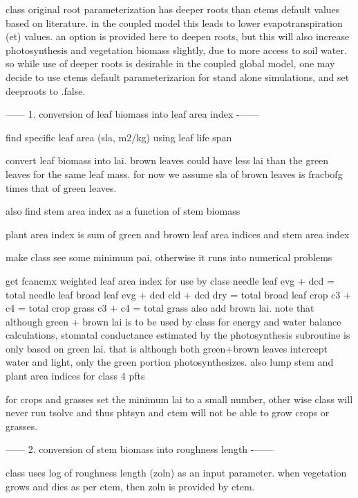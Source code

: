 class\textquotesingle{} original root parameterization has deeper roots than ctem\textquotesingle{}s default values based on literature. in the coupled model this leads to lower evapotranspiration (et) values. an option is provided here to deepen roots, but this will also increase photosynthesis and vegetation biomass slightly, due to more access to soil water. so while use of deeper roots is desirable in the coupled global model, one may decide to use ctem\textquotesingle{}s default parameterizarion for stand alone simulations, and set deeproots to .false.

------ 1. conversion of leaf biomass into leaf area index -\/------

find specific leaf area (sla, m2/kg) using leaf life span

convert leaf biomass into lai. brown leaves could have less lai than the green leaves for the same leaf mass. for now we assume sla of brown leaves is fracbofg times that of green leaves.

also find stem area index as a function of stem biomass

plant area index is sum of green and brown leaf area indices and stem area index

make class see some minimum pai, otherwise it runs into numerical problems

get fcancmx weighted leaf area index for use by class needle leaf evg + dcd = total needle leaf broad leaf evg + dcd cld + dcd dry = total broad leaf crop c3 + c4 = total crop grass c3 + c4 = total grass also add brown lai. note that although green + brown lai is to be used by class for energy and water balance calculations, stomatal conductance estimated by the photosynthesis subroutine is only based on green lai. that is although both green+brown leaves intercept water and light, only the green portion photosynthesizes. also lump stem and plant area indices for class\textquotesingle{} 4 pfts

for crops and grasses set the minimum lai to a small number, other wise class will never run tsolvc and thus phtsyn and ctem will not be able to grow crops or grasses.

------ 2. conversion of stem biomass into roughness length -\/------

class uses log of roughness length (zoln) as an input parameter. when vegetation grows and dies as per ctem, then zoln is provided by ctem.


